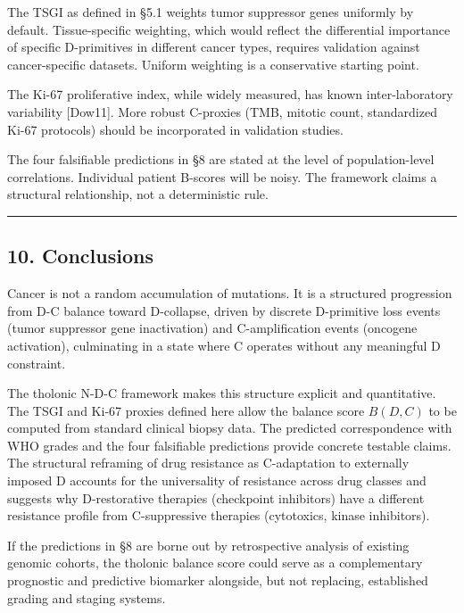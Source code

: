\documentclass[
  11pt,
  letterpaper,
]{article}
\begin{document}
The TSGI as defined in §5.1 weights tumor suppressor genes uniformly by
default. Tissue-specific weighting, which would reflect the differential
importance of specific D-primitives in different cancer types, requires
validation against cancer-specific datasets. Uniform weighting is a
conservative starting point.

The Ki-67 proliferative index, while widely measured, has known
inter-laboratory variability {[}Dow11{]}. More robust C-proxies (TMB,
mitotic count, standardized Ki-67 protocols) should be incorporated in
validation studies.

The four falsifiable predictions in §8 are stated at the level of
population-level correlations. Individual patient B-scores will be
noisy. The framework claims a structural relationship, not a
deterministic rule.

\begin{center}\rule{0.5\linewidth}{0.5pt}\end{center}

\subsection{10. Conclusions}\label{conclusions}

Cancer is not a random accumulation of mutations. It is a structured
progression from D-C balance toward D-collapse, driven by discrete
D-primitive loss events (tumor suppressor gene inactivation) and
C-amplification events (oncogene activation), culminating in a state
where C operates without any meaningful D constraint.

The tholonic N-D-C framework makes this structure explicit and
quantitative. The TSGI and Ki-67 proxies defined here allow the balance
score \(B(D,C)\) to be computed from standard clinical biopsy data. The
predicted correspondence with WHO grades and the four falsifiable
predictions provide concrete testable claims. The structural reframing
of drug resistance as C-adaptation to externally imposed D accounts for
the universality of resistance across drug classes and suggests why
D-restorative therapies (checkpoint inhibitors) have a different
resistance profile from C-suppressive therapies (cytotoxics, kinase
inhibitors).

If the predictions in §8 are borne out by retrospective analysis of
existing genomic cohorts, the tholonic balance score could serve as a
complementary prognostic and predictive biomarker alongside, but not
replacing, established grading and staging systems.
\end{document}
